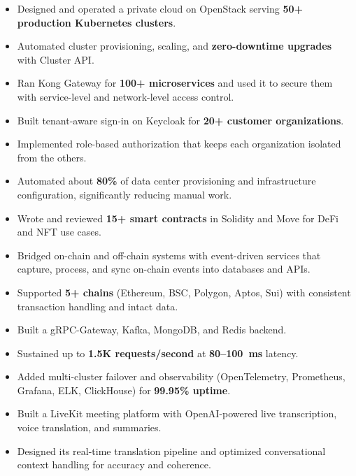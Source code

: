 \jobVNPAY
\begin{itemize}
    \item Designed and operated a private cloud on OpenStack serving \textbf{50+ production Kubernetes clusters}. %
    \item Automated cluster provisioning, scaling, and \textbf{zero-downtime upgrades} with Cluster API. %
    \item Ran Kong Gateway for \textbf{100+ microservices} and used it to secure them with service-level and network-level access control. %
    \item Built tenant-aware sign-in on Keycloak for \textbf{20+ customer organizations}. %
    \item Implemented role-based authorization that keeps each organization isolated from the others. %
    \item Automated about \textbf{80\%} of data center provisioning and infrastructure configuration, significantly reducing manual work. %
\end{itemize}

\jobEsolLabs
\begin{itemize}
    \item Wrote and reviewed \textbf{15+ smart contracts} in Solidity and Move for DeFi and NFT use cases. %
    \item Bridged on-chain and off-chain systems with event-driven services that capture, process, and sync on-chain events into databases and APIs. %
    \item Supported \textbf{5+ chains} (Ethereum, BSC, Polygon, Aptos, Sui) with consistent transaction handling and intact data. %
\end{itemize}


\projDattingQ
\begin{itemize}
    \item Built a gRPC-Gateway, Kafka, MongoDB, and Redis backend. %
    \item Sustained up to \textbf{1.5K requests/second} at \textbf{80--100~ms} latency. %
    \item Added multi-cluster failover and observability (OpenTelemetry, Prometheus, Grafana, ELK, ClickHouse) for \textbf{99.95\% uptime}. %
\end{itemize}

\projMeetQ
\begin{itemize}
    \item Built a LiveKit meeting platform with OpenAI-powered live transcription, voice translation, and summaries. %
    \item Designed its real-time translation pipeline and optimized conversational context handling for accuracy and coherence. %
\end{itemize}

\cveducation


